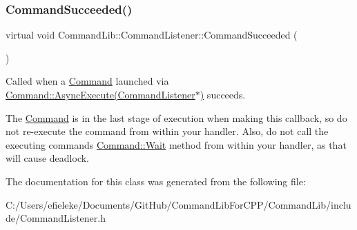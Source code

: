 \subsubsection{\texorpdfstring{Command\+Succeeded()}{CommandSucceeded()}}
{\footnotesize\ttfamily virtual void Command\+Lib\+::\+Command\+Listener\+::\+Command\+Succeeded (\begin{DoxyParamCaption}{ }\end{DoxyParamCaption})\hspace{0.3cm}{\ttfamily [pure virtual]}}



Called when a \mbox{\hyperlink{class_command_lib_1_1_command}{Command}} launched via \mbox{\hyperlink{class_command_lib_1_1_command_a44bad231a0f0a6de3d5405382d95f800}{Command\+::\+Async\+Execute(\+Command\+Listener$\ast$)}} succeeds. 

The \mbox{\hyperlink{class_command_lib_1_1_command}{Command}} is in the last stage of execution when making this callback, so do not re-\/execute the command from within your handler. Also, do not call the executing command\textquotesingle{}s \mbox{\hyperlink{class_command_lib_1_1_command_ac4d49fbf9bbcc543fb57e4b04edf1ddb}{Command\+::\+Wait}} method from within your handler, as that will cause deadlock. 

The documentation for this class was generated from the following file\+:\begin{DoxyCompactItemize}
\item 
C\+:/\+Users/efieleke/\+Documents/\+Git\+Hub/\+Command\+Lib\+For\+C\+P\+P/\+Command\+Lib/include/Command\+Listener.\+h\end{DoxyCompactItemize}
